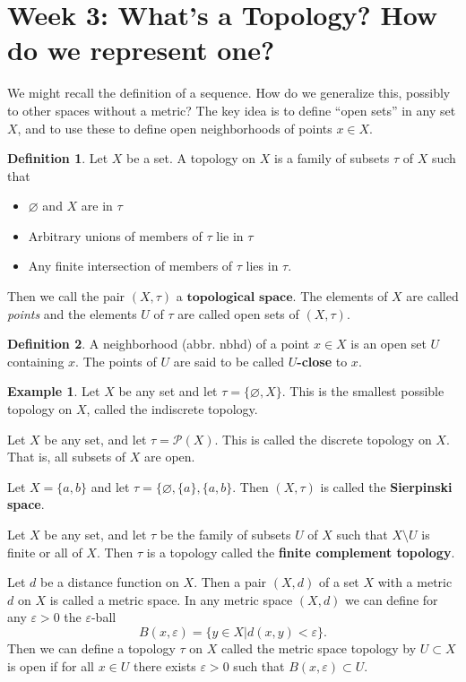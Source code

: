 \documentclass[12pt]{article}
\theoremstyle{plain}
\theoremstyle{definition}
\newtheorem{definition}{Definition}
\newtheorem{example}{Example}
\begin{document}
\section{Week 3: What's a Topology? How do we represent one?}

We might recall the definition of a sequence. How do we generalize this, possibly to other spaces without a metric? The key idea is to define ``open sets'' in any set $X$, and to use these to define open neighborhoods of points $x \in X$.

\begin{definition}
Let $X$ be a set. A topology on $X$ is a family of subsets $\tau$ of $X$ such that 
\begin{itemize}
	\item $\varnothing$ and $X$ are in $\tau$
	\item Arbitrary unions of members of $\tau$ lie in $\tau$
	\item Any finite intersection of members of $\tau$ lies in $\tau$.
\end{itemize}
Then we call the pair $(X, \tau)$ a $\textbf{topological space}$. The elements of $X$ are called \textit{points} and the elements $U$ of $\tau$ are called open sets of $(X, \tau)$. 
\end{definition}
\begin{definition}
A neighborhood (abbr. nbhd) of a point $x \in X$ is an open set $U$ containing $x$. The points of $U$ are said to be called \textbf{$U$-close} to $x$.
\end{definition}

\begin{example}
Let $X$ be any set and let $\tau = \{\varnothing, X\}$. This is the smallest possible topology on $X$, called the indiscrete topology.

Let $X$ be any set, and let $\tau = \mathcal{P}(X)$. This is called the discrete topology on $X$. That is, all subsets of $X$ are open.

Let $X = \{a,b\}$ and let $\tau = \{\varnothing, \{a\}, \{a, b\}$. Then $(X, \tau)$ is called the \textbf{Sierpinski space}.

Let $X$ be any set, and let $\tau$ be the family of subsets $U$ of $X$ such that $X \setminus U$ is finite or all of $X$. Then $\tau$ is a topology called the \textbf{finite complement topology}.

Let $d$ be a distance function on $X$. Then a pair $(X, d)$ of a set $X$ with a metric $d$ on $X$ is called a metric space. In any metric space $(X, d)$ we can define for any $\varepsilon > 0$ the $\varepsilon$-ball 
\[B(x, \varepsilon) = \{y \in X | d(x, y) < \varepsilon\}.\]
Then we can define a topology $\tau$ on $X$ called the metric space topology by $U \subset X$ is open if for all $x \in U$ there exists $\varepsilon > 0$ such that $B(x, \varepsilon) \subset U$. 
\end{example}
\end{document}
